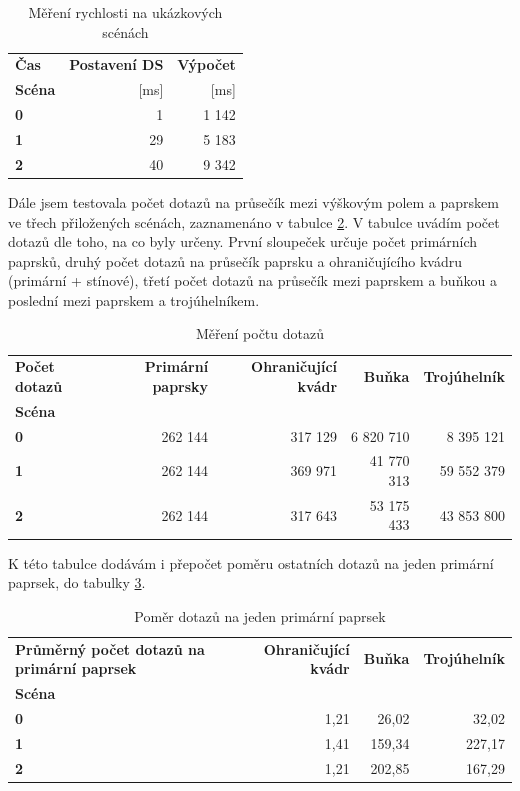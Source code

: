 \documentclass[report,11pt]{elsarticle}
\begin{document}
\begin{table}
\begin{tabular}{| l || r | r |}
\hline
\bfseries Čas & \bfseries Postavení DS & \bfseries Výpočet \\
\bfseries Scéna & [ms] & [ms] \\ \hline
\bfseries 0 & 1 & 1 142 \\ \hline
\bfseries 1 & 29 & 5 183 \\ \hline
\bfseries 2 & 40 & 9 342 \\ \hline
\end{tabular}
\caption{Měření rychlosti na ukázkových scénách}
\label{tab:measurementT2}
\end{table}


Dále jsem testovala počet dotazů na průsečík mezi výškovým polem a paprskem ve třech přiložených scénách, zaznamenáno v tabulce \ref{tab:measurementN1}. V tabulce uvádím počet dotazů dle toho, na co byly určeny. První sloupeček určuje počet primárních paprsků, druhý počet dotazů na průsečík paprsku a ohraničujícího kvádru (primární + stínové), třetí počet dotazů na průsečík mezi paprskem a buňkou a poslední mezi paprskem a trojúhelníkem.

\begin{table}
\begin{tabular}{| l || r | r | r | r |}
\hline
\bfseries Počet dotazů &  \bfseries Primární paprsky &  \bfseries Ohraničující kvádr &  \bfseries Buňka &  \bfseries Trojúhelník \\
\bfseries Scéna &  &  &  & \\ \hline
\bfseries 0 & 262 144 & 317 129 & 6 820 710 & 8 395 121 \\ \hline
\bfseries 1 & 262 144 & 369 971 & 41 770 313 & 59 552 379 \\ \hline
\bfseries 2 & 262 144 & 317 643 & 53 175 433 & 43 853 800 \\ \hline
\end{tabular}
\caption{Měření počtu dotazů}
\label{tab:measurementN1}
\end{table}

K této tabulce dodávám i přepočet poměru ostatních dotazů na jeden primární paprsek, do tabulky \ref{tab:measurementN2}.

\begin{table}
\begin{tabular}{| l || r | r | r |}
\hline
\bfseries Průměrný počet dotazů na primární paprsek & \bfseries Ohraničující kvádr &  \bfseries Buňka &  \bfseries Trojúhelník \\
\bfseries Scéna & & & \\ \hline
\bfseries 0 & 1,21 & 26,02 & 32,02 \\ \hline
\bfseries 1 & 1,41 & 159,34 & 227,17 \\ \hline
\bfseries 2 & 1,21 & 202,85 & 167,29 \\ \hline
\end{tabular}
\caption{Poměr dotazů na jeden primární paprsek}
\label{tab:measurementN2}
\end{table}
\end{document}

